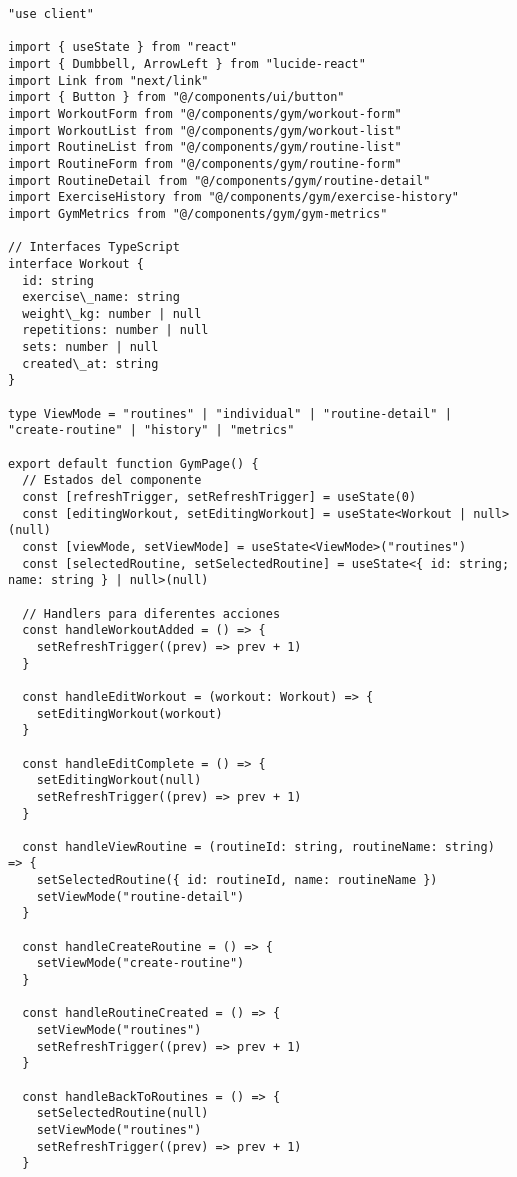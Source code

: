 \documentclass[12pt,a4paper]{article}
\begin{document}
\begin{lstlisting}[caption=app/gym/page.tsx - Estructura completa]
"use client"

import { useState } from "react"
import { Dumbbell, ArrowLeft } from "lucide-react"
import Link from "next/link"
import { Button } from "@/components/ui/button"
import WorkoutForm from "@/components/gym/workout-form"
import WorkoutList from "@/components/gym/workout-list"
import RoutineList from "@/components/gym/routine-list"
import RoutineForm from "@/components/gym/routine-form"
import RoutineDetail from "@/components/gym/routine-detail"
import ExerciseHistory from "@/components/gym/exercise-history"
import GymMetrics from "@/components/gym/gym-metrics"

// Interfaces TypeScript
interface Workout {
  id: string
  exercise\_name: string
  weight\_kg: number | null
  repetitions: number | null
  sets: number | null
  created\_at: string
}

type ViewMode = "routines" | "individual" | "routine-detail" | "create-routine" | "history" | "metrics"

export default function GymPage() {
  // Estados del componente
  const [refreshTrigger, setRefreshTrigger] = useState(0)
  const [editingWorkout, setEditingWorkout] = useState<Workout | null>(null)
  const [viewMode, setViewMode] = useState<ViewMode>("routines")
  const [selectedRoutine, setSelectedRoutine] = useState<{ id: string; name: string } | null>(null)

  // Handlers para diferentes acciones
  const handleWorkoutAdded = () => {
    setRefreshTrigger((prev) => prev + 1)
  }

  const handleEditWorkout = (workout: Workout) => {
    setEditingWorkout(workout)
  }

  const handleEditComplete = () => {
    setEditingWorkout(null)
    setRefreshTrigger((prev) => prev + 1)
  }

  const handleViewRoutine = (routineId: string, routineName: string) => {
    setSelectedRoutine({ id: routineId, name: routineName })
    setViewMode("routine-detail")
  }

  const handleCreateRoutine = () => {
    setViewMode("create-routine")
  }

  const handleRoutineCreated = () => {
    setViewMode("routines")
    setRefreshTrigger((prev) => prev + 1)
  }

  const handleBackToRoutines = () => {
    setSelectedRoutine(null)
    setViewMode("routines")
    setRefreshTrigger((prev) => prev + 1)
  }


\end{lstlisting}
\end{document}
